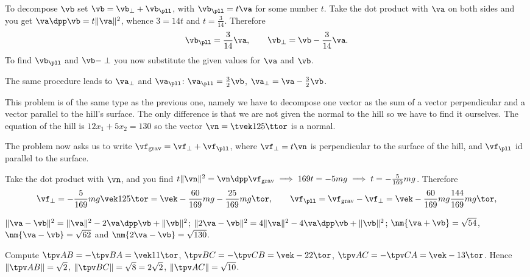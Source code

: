 \item[{\bfseries(VI11.1)}]

To decompose $\vb$ set $\vb= \vb_\perp+\vb_\pll$, with $\vb_\pll = t\va$ for
some number $t$.  Take the dot product with $\va$ on both sides and you get
$\va\dpp\vb = t\|\va\|^2$, whence $3 = 14 t$ and $t=\frac3{14}$.  Therefore
\[
  \vb_\pll = \frac{3}{14}\va, \qquad \vb_\perp = \vb-\frac{3}{14}\va.
\]
To find $\vb_\pll$ and $\vb-\perp$ you now substitute the given values for
$\va$ and $\vb$.


The same procedure leads to $\va_\perp$ and $\va_\pll$:
$\va_\pll = \frac{3}{2}\vb$, $\va_\perp = \va - \frac32\vb$.
\bigskip

\item[{\bfseries(VI11.2)}]

This problem is of the same type as the previous one, namely we have to
decompose one vector as the sum of a vector perpendicular and a vector
parallel to the hill's surface.  The only difference is that we are not given
the normal to the hill so we have to find it ourselves.  The equation of the
hill is $12x_1 + 5x_2 = 130$ so the vector $\vn = \tvek 12\\ 5\ttor$ is a
normal.

The problem now asks us to write $\vf_{\rm grav} = \vf_\perp + \vf_\pll$,
where $\vf_\perp = t\vn$ is perpendicular to the surface of the hill, and
$\vf_\pll$ id parallel to the surface.

Take the dot product with $\vn$, and you find $t\|\vn\|^2 =
\vn\dpp\vf_{\rm grav} \implies 169t = -5mg \implies t=-\frac{5}{169}mg$.
Therefore
\[
  \vf_\perp = -\frac{5}{169}mg\vek12 \\5\tor
  =\vek -\frac{60}{169}mg \\ -\frac{25}{169}mg\tor,
  \qquad
  \vf_\pll = \vf_{\rm grav} - \vf_\perp
  = \vek -\frac{60}{169}mg \\ \frac{144}{169}mg\tor,
\]
\bigskip

\item[{\bfseries(VI12.1c)}]

$\|\va-\vb\|^2 = \|\va\|^2 - 2\va\dpp\vb + \|\vb\|^2$;
$\|2\va-\vb\|^2 = 4\|\va\|^2 - 4\va\dpp\vb + \|\vb\|^2$;
$\nm{\va+\vb} = \sqrt{54}$, $\nm{\va-\vb} = \sqrt{62}$ and
$\nm{2\va-\vb}=\sqrt{130}$.
\bigskip

\item[{\bfseries(VI12.3)}]

Compute $\tpv AB = -\tpv BA = \vek 1\\ 1\tor$,
$\tpv BC = -\tpv CB = \vek -2 \\ 2 \tor$,
$\tpv AC = -\tpv CA = \vek -1 \\ 3 \tor$.
Hence
$\|\tpv AB\| = \sqrt{2}$,
$\|\tpv BC\| = \sqrt{8} = 2\sqrt{2}$,
$\|\tpv AC\| = \sqrt{10}$.

